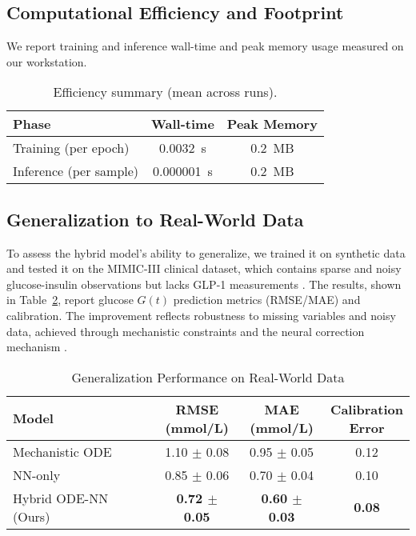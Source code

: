 \documentclass[9pt,shortpaper,twoside,web]{ieeecolor}
\begin{document}
\subsection{Computational Efficiency and Footprint}
\label{subsec:efficiency}
We report training and inference wall-time and peak memory usage measured on our workstation.

\begin{table}[h]
\centering
\caption{Efficiency summary (mean across runs).}
\label{tab:efficiency}
\begin{tabular}{lcc}
\toprule
Phase & Wall-time & Peak Memory \\
\midrule
Training (per epoch) & \SI{0.0032}{s} & \SI{0.2}{MB} \\
Inference (per sample) & \SI{0.000001}{s} & \SI{0.2}{MB} \\
\bottomrule
\end{tabular}
\end{table}

\subsection{Generalization to Real-World Data}

To assess the hybrid model's ability to generalize, we trained it on synthetic data and tested it on the MIMIC-III clinical dataset, which contains sparse and noisy glucose-insulin observations but lacks GLP-1 measurements \cite{johnson2016mimic}. The results, shown in Table~\ref{tab:real_results}, report glucose $G(t)$ prediction metrics (RMSE/MAE) and calibration. The improvement reflects robustness to missing variables and noisy data, achieved through mechanistic constraints and the neural correction mechanism \cite{bishop2006pattern}.



\begin{table}[h]
\caption{Generalization Performance on Real-World Data}
\label{tab:real_results}
\centering
\begin{tabularx}{\linewidth}{l|c|c|c}
\hline
\textbf{Model} 
& \makecell{\textbf{RMSE}\\\textbf{(mmol/L)}} 
& \makecell{\textbf{MAE}\\\textbf{(mmol/L)}} 
& \makecell{\textbf{Calibration}\\\textbf{Error}} \\ \hline
Mechanistic ODE & 1.10 $\pm$ 0.08 & 0.95 $\pm$ 0.05 & 0.12 \\
NN-only         & 0.85 $\pm$ 0.06 & 0.70 $\pm$ 0.04 & 0.10 \\
Hybrid ODE-NN (Ours) & \textbf{0.72 $\pm$ 0.05} & \textbf{0.60 $\pm$ 0.03} & \textbf{0.08} \\
\hline
\end{tabularx}
\end{table}
\end{document}
